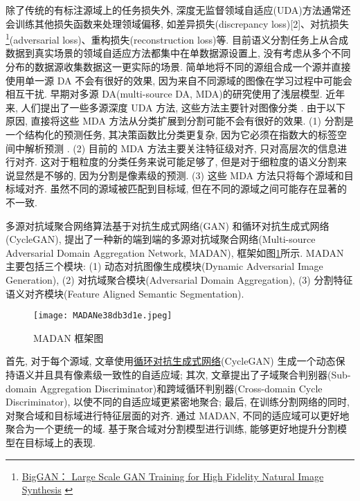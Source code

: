 除了传统的有标注源域上的任务损失外, 深度无监督领域自适应(UDA)方法通常还会训练其他损失函数来处理领域偏移, 如差异损失(discrepancy loss)[2]、对抗损失\footnote{\href{https://colab.research.google.com/github/tensorflow/hub/blob/master/examples/colab/biggan_generation_with_tf_hub.ipynb}{BigGAN： Large Scale GAN Training for High Fidelity Natural Image Synthesis} \label{GANnote2020031201}}(adversarial loss)\cite{ZhuPark20178237506}、重构损失(reconstruction loss)\cite{GoodfellowGAN2014}等.
目前语义分割任务上从合成数据到真实场景的领域自适应方法都集中在单数据源设置上, 没有考虑从多个不同分布的数据源收集数据这一更实际的场景. 简单地将不同的源组合成一个源并直接使用单一源 DA 不会有很好的效果, 因为来自不同源域的图像在学习过程中可能会相互干扰. 早期对多源 DA(multi-source DA,  MDA)的研究使用了浅层模型.
近年来, 人们提出了一些多源深度 UDA 方法, 这些方法主要针对图像分类 \cite{Ghifary2015}. 由于以下原因, 直接将这些 MDA 方法从分类扩展到分割可能不会有很好的效果. (1) 分割是一个结构化的预测任务, 其决策函数比分类更复杂, 因为它必须在指数大的标签空间中解析预测 \cite{Zhang2017}. (2) 目前的 MDA 方法主要关注特征级对齐, 只对高层次的信息进行对齐. 这对于粗粒度的分类任务来说可能足够了, 但是对于细粒度的语义分割来说显然是不够的, 因为分割是像素级的预测. (3) 这些 MDA 方法只将每个源域和目标域对齐. 虽然不同的源域被匹配到目标域, 但在不同的源域之间可能存在显著的不一致.

多源对抗域聚合网络算法基于对抗生成式网络(GAN)\cite{GoodfellowGAN2014} 和循环对抗生成式网络(CycleGAN)\cite{ZhuPark20178237506}, 提出了一种新的端到端的多源对抗域聚合网络(Multi-source Adversarial Domain Aggregation Network,  MADAN), 框架如图\ref{MADANe38db3d1e}所示. MADAN 主要包括三个模块: (1) 动态对抗图像生成模块(Dynamic Adversarial Image Generation), (2) 对抗域聚合模块(Adversarial Domain Aggregation), (3) 分割特征语义对齐模块(Feature Aligned Semantic Segmentation).
\begin{figure}[H]
	\centering
	\texttt{[image: MADANe38db3d1e.jpeg]}
	\caption{MADAN 框架图}
   \label{MADANe38db3d1e}
\end{figure}
首先, 对于每个源域, 文章使用\href{https://blog.csdn.net/dugudaibo/article/details/82903233}{循环对抗生成式网络}(CycleGAN)\cite{Long2015CVPR} 生成一个动态保持语义并且具有像素级一致性的自适应域;
其次, 文章提出了子域聚合判别器(Sub-domain Aggregation Discriminator)和跨域循环判别器(Cross-domain Cycle Discriminator), 以使不同的自适应域更紧密地聚合; 最后, 在训练分割网络的同时, 对聚合域和目标域进行特征层面的对齐.
通过 MADAN, 不同的适应域可以更好地聚合为一个更统一的域. 基于聚合域对分割模型进行训练, 能够更好地提升分割模型在目标域上的表现.
